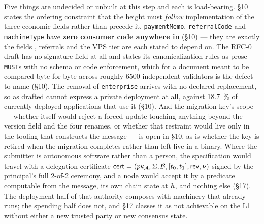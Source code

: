Five things are undecided or unbuilt at this step and each is load-bearing.  \S10 states the
ordering constraint that the height must \emph{follow} implementation of the three economic fields
rather than precede it. \texttt{paymentMemo}, \texttt{referralCode} and \texttt{machineType} have
\textbf{zero consumer code anywhere in \FluxOS} (\S10) --- they are exactly the fields \PNR,
referrals and the VPS tier are each stated to depend on. The RFC-0 draft has no signature field at
all and states its canonicalization rules as prose \texttt{MUST}s with no schema or code enforcement,
which for a document meant to be compared byte-for-byte across roughly \num{6500} independent
validators is the defect to name (\S10). The removal of \texttt{enterprise} arrives with no declared
replacement, so  as drafted cannot express a private deployment at all, against
\SI{18.7}{\percent} of currently deployed applications that use it (\S10). And the migration key's
scope --- whether \fluxd itself would reject a forced update touching anything beyond the version
field and the four renames, or whether that restraint would live only in the tooling that constructs
the message --- is open in \S10, as is whether the key is retired when the migration completes rather
than left live in a binary. Where the submitter is autonomous software rather than a person, the
specification would travel with a delegation certificate
$\mathsf{cert} = (pk_{\mathcal{A}}, \Sigma, \mathcal{B}, [t_0,t_1], \mathsf{rev}, \nu)$ signed by the
principal's full 2-of-2 ceremony, and a node would accept it by a predicate computable from the
message, its own chain state at $h$, and nothing else (\S17). The deployment half of that
authority composes with machinery that already runs; the spending half does not, and \S17 classes it
as not achievable on the \Flux L1 without either a new trusted party or new consensus state.

